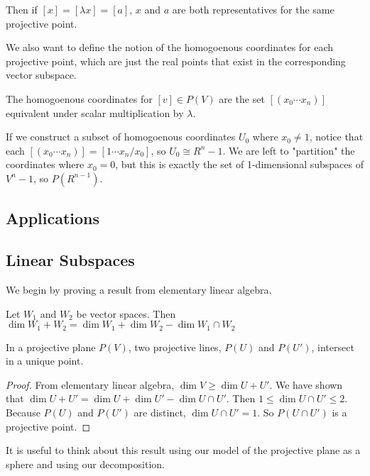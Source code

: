 \documentclass[10pt]{article}
\begin{document}
Then if $[x] = [\lambda x] = [a]$, $x$ and $a$ are both representatives for the same projective point.

We also want to define the notion of the homogoenous coordinates for each
projective point, which are just the real points that exist in the
corresponding vector subspace.

\begin{definition}
	The homogoenous coordinates for $[v] \in P(V)$ are the set $[(x_0 \cdots x_n)]$ equivalent under scalar multiplication by $\lambda$.
\end{definition}

If we construct a subset of homogoenous coordinates $U_0$ where $x_0 \neq 1$,
notice that each $[(x_0 \cdots x_n)] = [1 \cdots x_n / x_0]$, so $U_0 \cong
R^n-1$. We are left to "partition" the coordinates where $x_0 = 0$, but this is
exactly the set of 1-dimensional subspaces of $V^n-1$, so $P(R^{n-1})$.

\subsection{Applications}


\subsection{Linear Subspaces}

We begin by proving a result from elementary linear algebra.


\begin{theorem}
	Let $W_1$ and $W_2$ be vector spaces. Then $\dim W_1 + W_2 = \dim W_1 + \dim W_2 - \dim W_1 \cap W_2$ 
\end{theorem}

\begin{theorem}
	In a projective plane $P(V)$, two projective lines, $P(U)$ and $P(U')$, intersect in a unique point.
\end{theorem}
\begin{proof}
	From elementary linear algebra, $\dim V \geq \dim U + U'$. We have shown that $\dim U + U' = \dim U + \dim U' - \dim {U \cap U'}$.
	Then $1 \leq \dim {U \cap U'} \leq 2$. Because $P(U)$ and $P(U')$ are distinct, $\dim {U \cap U'} = 1$. So $P(U \cap U')$ is a projective point.
\end{proof}

It is useful to think about this result using our model of the projective plane as a sphere and using our decomposition.
\end{document}
